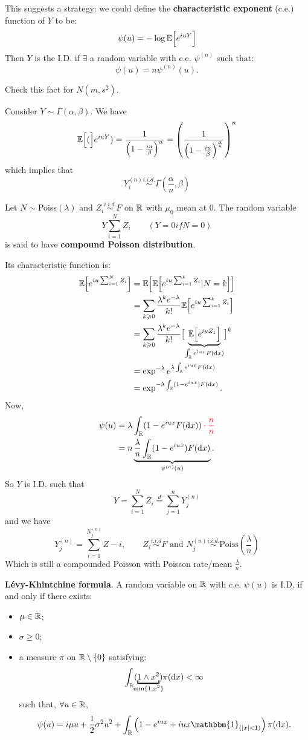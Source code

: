 \documentclass{article}
\begin{document}
	This suggests a strategy: we could define the \textbf{characteristic exponent} (c.e.) function of $Y$ to be:
	\[
	\psi(u)=-\log\mathbb{E}\Bigl[{e^{iuY}}\Bigr]
	\]
	Then $Y$ is the I.D. if $\exists$ a random variable with c.e. $\psi^{(n)}$ such that:
	\[\psi(u)=n\psi^{(n)}(u).\]
	\begin{exercise}
		Check this fact for $N(m,s^2)$.
	\end{exercise}
	\begin{example}
		Consider $Y\sim\Gamma(\alpha,\beta)$. We have
		\[
		\mathbb{E}\Bigl[{(}\Bigr]e^{iuY})=\frac{1}{\left(1-\frac{iu}{\beta}\right)^\alpha}=\left(\frac{1}{\left(1-\frac{iu}{\beta}\right)^\frac{\alpha}{n}}\right)^n
		\]
		which implies that 
		\[
		Y_i^{(n)}\stackrel{i.i.d.}{\sim}\Gamma(\frac{\alpha}{n},\beta)
		\]
	\end{example}
	\begin{definition}
		Let $N\sim$Poiss$(\lambda)$ and $Z_i\stackrel{i.i.d.}{\sim}F$ on $\mathbb{R}$ with $\mu_0$ mean at 0. The random variable
		\[Y\sum_{i=1}^{N}Z_i\qquad(Y=0 if N=0)\]
		is said to have \textbf{compound Poisson distribution}.
	\end{definition}
	Its characteristic function is:
	\begin{align*}
		\mathbb{E}\Bigl[{e^{iu\sum_{i=1}^{N}Z_i}}\Bigr]&=\mathbb{E}\Bigl[{\mathbb{E}\Bigl[{e^{iu\sum_{i=1}^{k}Z_i}|N=k}\Bigr]}\Bigr]\\
		&=\sum_{k\geqslant0}\frac{\lambda^ke^{-\lambda}}{k!}\mathbb{E}\Bigl[{e^{iu\sum_{i=1}^{k}Z_i}}\Bigr]\\
		&=\sum_{k\geqslant0}\frac{\lambda^ke^{-\lambda}}{k!}\bigl[\underbrace{\mathbb{E}\Bigl[{e^{iuZ_1}}\Bigr]}_{\int_{\mathbb{R}} e^{iux}F(\mathop{}\!\mathrm{d} x)}\bigr]^k\\
		&=\exp^{-\lambda}e^{\lambda\int_{\mathbb{R}} e^{iux}F(\mathop{}\!\mathrm{d} x)}\\
		&=\exp^{-\lambda\int_{\mathbb{R}}(1-e^{iux})F(\mathop{}\!\mathrm{d} x)}.
	\end{align*}
	Now,
	\begin{align*}
		\psi(u)&=\lambda\int_\R(1-e^{iux}F(\dif x))\begingroup\color{red}\cdot\frac{n}{n}\endgroup\\
		&=n\underbrace{\frac{\lambda}{n}\int_\R(1-e^{iux})F(\dif x)}_{\psi^{(n)}(u)}.
	\end{align*}
	So $Y$ is I.D. such that \[Y=\sum_{i=1}^{N}Z_i\stackrel{d}{=}\sum_{j=1}^{n}Y_j^{(n)}\]
	and we have
	\[
	Y_j^{(n)}=\sum_{i=1}^{N_j^{(n)}}Z-i,\qquad Z_i\stackrel{i.i.d}{\sim}F\text{ and }N_j^{(n)}\stackrel{i.i.d.}{\sim}\text{Poiss}\left(\frac{\lambda}{n}\right)
	\]
	Which is still a compounded Poisson with Poisson rate/mean $\frac{\lambda}{n}$.
	\begin{theorem}
		\textbf{L\'evy-Khintchine formula}. A random variable on $\mathbb{R}$ with c.e. $\psi(u)$ is I.D. if and only if there exists:
		\begin{itemize}
			\item $\mu \in \mathbb{R}$;
			\item $\sigma\geqslant 0$;
			\item a measure $\pi$ on $\mathbb{R}\setminus\{0\}$ satisfying:
			\[\int_\R(\underbracket{1\wedge x^2}_{\mathclap{\min\{1,x^2\}}})\pi(\dif x)<\infty\]
			such that, $\forall u\in\mathbb{R}$,
			\[\psi(u)=i\mu u +\frac{1}{2}\sigma^2 u^2+\int_\R\left(1-e^{iux}+iux\mathbbm{1}_{(|x|<1)}\right)\pi(\dif x).\]
		\end{itemize}
	\end{theorem}
\end{document}

